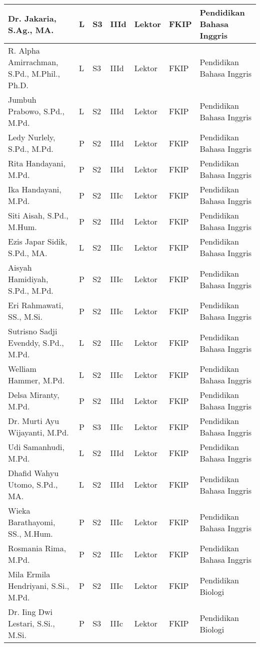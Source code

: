 \documentclass[
]{book}
\begin{document}
\begin{longtable}{l|l|l|l|l|l|l}
Dr. Jakaria, S.Ag., MA. & L & S3 & IIId & Lektor & FKIP & Pendidikan Bahasa Inggris\\
\hline
R. Alpha Amirrachman, S.Pd., M.Phil., Ph.D. & L & S3 & IIId & Lektor & FKIP & Pendidikan Bahasa Inggris\\
\hline
Jumbuh Prabowo, S.Pd., M.Pd. & L & S2 & IIId & Lektor & FKIP & Pendidikan Bahasa Inggris\\
\hline
Ledy Nurlely, S.Pd., M.Pd. & P & S2 & IIId & Lektor & FKIP & Pendidikan Bahasa Inggris\\
\hline
Rita Handayani, M.Pd. & P & S2 & IIId & Lektor & FKIP & Pendidikan Bahasa Inggris\\
\hline
Ika Handayani, M.Pd. & P & S2 & IIIc & Lektor & FKIP & Pendidikan Bahasa Inggris\\
\hline
Siti Aisah, S.Pd., M.Hum. & P & S2 & IIId & Lektor & FKIP & Pendidikan Bahasa Inggris\\
\hline
Ezis Japar Sidik, S.Pd., MA. & L & S2 & IIIc & Lektor & FKIP & Pendidikan Bahasa Inggris\\
\hline
Aisyah Hamidiyah, S.Pd., M.Pd. & P & S2 & IIIc & Lektor & FKIP & Pendidikan Bahasa Inggris\\
\hline
Eri Rahmawati, SS., M.Si. & P & S2 & IIIc & Lektor & FKIP & Pendidikan Bahasa Inggris\\
\hline
Sutrisno Sadji Evenddy, S.Pd., M.Pd. & L & S2 & IIIc & Lektor & FKIP & Pendidikan Bahasa Inggris\\
\hline
Welliam Hammer, M.Pd. & L & S2 & IIIc & Lektor & FKIP & Pendidikan Bahasa Inggris\\
\hline
Delsa Miranty, M.Pd. & P & S2 & IIId & Lektor & FKIP & Pendidikan Bahasa Inggris\\
\hline
Dr. Murti Ayu Wijayanti, M.Pd. & P & S3 & IIIc & Lektor & FKIP & Pendidikan Bahasa Inggris\\
\hline
Udi Samanhudi, M.Pd. & L & S2 & IIId & Lektor & FKIP & Pendidikan Bahasa Inggris\\
\hline
Dhafid Wahyu Utomo, S.Pd., MA. & L & S2 & IIId & Lektor & FKIP & Pendidikan Bahasa Inggris\\
\hline
Wieka Barathayomi, SS., M.Hum. & P & S2 & IIIc & Lektor & FKIP & Pendidikan Bahasa Inggris\\
\hline
Rosmania Rima, M.Pd. & P & S2 & IIIc & Lektor & FKIP & Pendidikan Bahasa Inggris\\
\hline
Mila Ermila Hendriyani, S.Si., M.Pd. & P & S2 & IIIc & Lektor & FKIP & Pendidikan Biologi\\
\hline
Dr. Iing Dwi Lestari, S.Si., M.Si. & P & S3 & IIIc & Lektor & FKIP & Pendidikan Biologi\\

\end{longtable}
\end{document}
